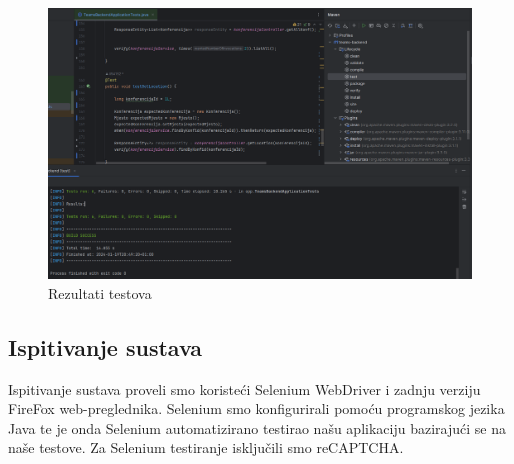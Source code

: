 \begin{packed_enum}
			\begin{figure}[H]
				\includegraphics[width=\textwidth]{slike/JUnitAll.png} %
				\caption{Rezultati testova}
				\label{fig:JUnitAll} %
			\end{figure}
			
				
			\end{packed_enum}
			
			
			
			\subsection{Ispitivanje sustava}
			Ispitivanje sustava proveli smo koristeći Selenium WebDriver i zadnju verziju FireFox web-preglednika. Selenium smo konfigurirali pomoću programskog jezika Java te je onda Selenium automatizirano testirao našu aplikaciju bazirajući se na naše testove. Za Selenium testiranje isključili smo reCAPTCHA.
	
